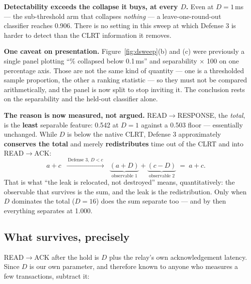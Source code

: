 \documentclass[10pt,a4paper,oneside]{article}
\newcommand{\num}[1]{\mbox{#1}}
\begin{document}
\textbf{Detectability exceeds the collapse it buys, at every $D$.} Even at $D=1$\,ms --- the
sub-threshold arm that collapses \emph{nothing} --- a leave-one-round-out classifier reaches
\num{0.906}. There is no setting in this sweep at which Defense 3 is harder to detect than
the CLRT information it removes.

\textbf{One caveat on presentation.} Figure~\ref{fig:dsweep}(b) and (c) were
previously a single panel plotting ``\% collapsed below 0.1\,ms'' and separability $\times$
100 on one percentage axis. Those are not the same kind of quantity --- one is a thresholded
sample proportion, the other a ranking statistic --- so they must not be compared
arithmetically, and the panel is now split to stop inviting it. The conclusion rests on the
separability and the held-out classifier alone.

\textbf{The reason is now measured, not argued.} READ$\to$RESPONSE, the \emph{total}, is the
\textbf{least} separable feature: \num{0.542} at $D=1$ against a \num{0.503} floor ---
essentially unchanged. While $D$ is below the native CLRT, Defense 3 approximately
\textbf{conserves the total} and merely \textbf{redistributes} time out of the CLRT and into
READ$\to$ACK:
\begin{equation}
a + c
\;\;\xrightarrow{\ \text{Defense 3, } D<c\ }\;\;
\underbrace{(a+D)}_{\text{observable 1}} + \underbrace{(c-D)}_{\text{observable 2}}
\;=\; a+c .
\label{eq:conserve}
\end{equation}
That is what ``the leak is relocated, not destroyed'' means, quantitatively: the observable
that survives is the sum, and the leak is the redistribution. Only when $D$ dominates the
total ($D=16$) does the sum separate too --- and by then everything separates at
\num{1.000}.

\subsection{What survives, precisely}

READ$\to$ACK after the hold is $D$ plus the relay's own acknowledgement latency. Since $D$
is our own parameter, and therefore known to anyone who measures a few transactions,
subtract it:
\end{document}
